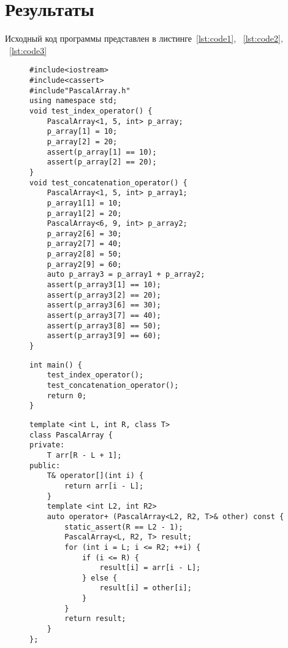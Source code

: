 \documentclass[a4paper, 14pt]{extarticle}
\begin{document}
\section{Результаты}\label{Sect::res}

Исходный код программы представлен в листинге~\ref{lst:code1}, ~\ref{lst:code2}, ~\ref{lst:code3}

\begin{figure}[!htb]
\begin{lstlisting}[language={},caption={Функции для проверки(main.cpp)},label={lst:code1}]
#include<iostream>
#include<cassert>
#include"PascalArray.h"
using namespace std;
void test_index_operator() {
    PascalArray<1, 5, int> p_array;
    p_array[1] = 10;
    p_array[2] = 20;
    assert(p_array[1] == 10);
    assert(p_array[2] == 20);
}
void test_concatenation_operator() {
    PascalArray<1, 5, int> p_array1;
    p_array1[1] = 10;
    p_array1[2] = 20;
    PascalArray<6, 9, int> p_array2;
    p_array2[6] = 30;
    p_array2[7] = 40;
    p_array2[8] = 50;
    p_array2[9] = 60;
    auto p_array3 = p_array1 + p_array2;
    assert(p_array3[1] == 10);
    assert(p_array3[2] == 20);
    assert(p_array3[6] == 30);
    assert(p_array3[7] == 40);
    assert(p_array3[8] == 50);
    assert(p_array3[9] == 60);
}
\end{lstlisting}
\end{figure}

\begin{figure}[!htb]
\begin{lstlisting}[language={},caption={main(main.cpp)},label={lst:code2}]
int main() {
    test_index_operator();
    test_concatenation_operator();
    return 0;
}
\end{lstlisting}
\end{figure}

\begin{figure}[!htb]
\begin{lstlisting}[language={},caption={класс PascalArray},label={lst:code3}]
template <int L, int R, class T>
class PascalArray {
private:
    T arr[R - L + 1];
public:
    T& operator[](int i) {
        return arr[i - L];
    }
    template <int L2, int R2>
    auto operator+ (PascalArray<L2, R2, T>& other) const {
        static_assert(R == L2 - 1);
        PascalArray<L, R2, T> result;
        for (int i = L; i <= R2; ++i) {
            if (i <= R) {
                result[i] = arr[i - L];
            } else {
                result[i] = other[i];
            }
        }
        return result;
    }
};
\end{lstlisting}
\end{figure}
\end{document}
